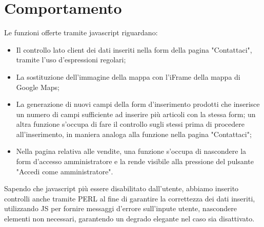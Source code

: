 \section{Comportamento}{
	Le funzioni offerte tramite javascript riguardano: 
	\begin{itemize}
		\item Il controllo lato client dei dati inseriti nella form della pagina "Contattaci", tramite l'uso d'espressioni regolari;
		\item La sostituzione dell'immagine della mappa con l'iFrame della mappa di Google Maps;
		\item La generazione di nuovi campi della form d'inserimento prodotti che inserisce un numero di campi sufficiente ad inserire più articoli con la stessa form; un altra funzione s'occupa di fare il controllo sugli stessi prima di procedere all'inserimento, in maniera analoga alla funzione nella pagina "Contattaci";
		\item Nella pagina relativa alle vendite, una funzione s'occupa di nascondere la form d'accesso amministratore e la rende visibile alla pressione del pulsante "Accedi come amministratore".
	\end{itemize}
	Sapendo che javascript più essere disabilitato dall'utente, abbiamo inserito controlli anche tramite PERL al fine di garantire la correttezza dei dati inseriti, utilizzando JS per fornire messaggi d'errore sull'inpute utente, nascondere elementi non necessari, garantendo un degrado elegante nel caso sia disattivato.
}